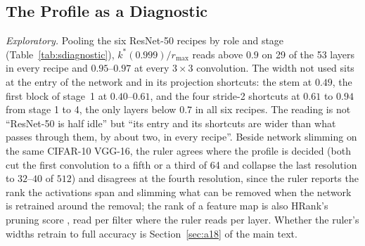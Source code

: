 \documentclass[10pt,journal,compsoc]{IEEEtran}
\begin{document}
\subsection*{The Profile as a Diagnostic}
\label{sec:diagnostic}

\emph{Exploratory.} Pooling the six ResNet-50 recipes by role and stage
(Table~\ref{tab:sdiagnostic}), $k^*(0.999)/r_{\max}$ reads above $0.9$ on 29 of
the 53 layers in every recipe and $0.95$--$0.97$ at every $3\!\times\!3$
convolution. The width not used sits at the entry of the network and in
its projection shortcuts: the stem at $0.49$, the first block of stage~1
at $0.40$--$0.61$, and the four stride-2 shortcuts at $0.61$ to $0.94$
from stage 1 to 4, the only layers below $0.7$ in all six recipes. The reading
is not ``ResNet-50 is half idle'' but ``its entry and its shortcuts are
wider than what passes through them, by about two, in every recipe''.
Beside network slimming \cite{liu2017slimming} on the same CIFAR-10
VGG-16, the ruler agrees where the profile is decided (both cut the first
convolution to a fifth or a third of 64 and collapse the last resolution
to $32$--$40$ of $512$) and disagrees at the fourth resolution, since the
ruler reports the rank the activations span and slimming what can be
removed when the network is retrained around the removal; the rank of a
feature map is also HRank's pruning score \cite{lin2020hrank}, read per
filter where the ruler reads per layer. Whether the
ruler's widths retrain to full accuracy is Section~\ref{sec:a18} of the main text.




\begin{table}[t]
  \caption{Widths from the ruler, retrained from scratch (pre-registered, plan Sections~9.5, 9.7, 9.8 and 9.11): VGG-16 (BN), three seeds per arm, test accuracy at epoch 100 as mean $\pm$ SD over seeds, and the median over layers of the retrained network's own $k^*(0.999)/r_{\max}$. MACs are multiply-adds per $32 \times 32$ image; img/s is inference throughput on one RTX 4090 at batch 256. The lower block is ResNet-18 on ImageNet-1k under the \texttt{torchvision} reference recipe, two seeds per arm, final-epoch top-1 as mean $\pm$ SD of the two seeds (the two full-width seeds differ by $0.60$ points); its MACs are per $224 \times 224$ image, and its throughput and retrained level were not measured. Generated by \texttt{checkpoint\_analysis.py}.}
  \label{tab:sa18}
  \centering
  \scriptsize
  \setlength{\tabcolsep}{4pt}
  
\end{table}
\end{document}
